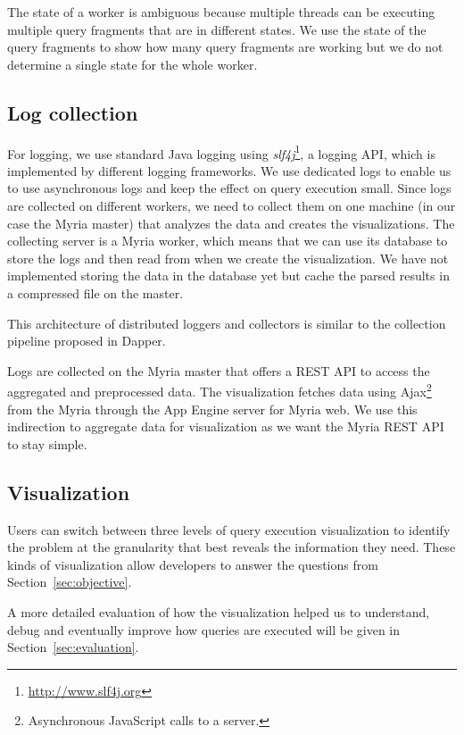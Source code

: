 \documentclass[11pt]{scrartcl}
\begin{document}
The state of a worker is ambiguous because multiple threads can be executing multiple query fragments that are in different states. We use the state of the query fragments to show how many query fragments are working but we do not determine a single state for the whole worker.


\subsection{Log collection}
\label{sec:collect}

For logging, we use standard Java logging using \emph{slf4j}\footnote{\url{http://www.slf4j.org}}, a logging API, which is implemented by different logging frameworks. We use dedicated logs to enable us to use asynchronous logs and keep the effect on query execution small. Since logs are collected on different workers, we need to collect them on one machine (in our case the Myria master) that analyzes the data and creates the visualizations. The collecting server is a Myria worker, which means that we can use its database to store the logs and then read from when we create the visualization. We have not implemented storing the data in the database yet but cache the parsed results in a compressed file on the master.

This architecture of distributed loggers and collectors is similar to the collection pipeline proposed in Dapper\cite{sigelman2010dapper}.

Logs are collected on the Myria master that offers a REST API to access the aggregated and preprocessed data. The visualization fetches data using Ajax\footnote{Asynchronous JavaScript calls to a server.} from the Myria through the App Engine server for Myria web. We use this indirection to aggregate data for visualization as we want the Myria REST API to stay simple.


\subsection{Visualization}
\label{sec:visualization}

Users can switch between three levels of query execution visualization to identify the problem at the granularity that best reveals the information they need. These kinds of visualization allow developers to answer the questions from Section~\ref{sec:objective}.

A more detailed evaluation of how the visualization helped us to understand, debug and eventually improve how queries are executed will be given in Section~\ref{sec:evaluation}.
\end{document}
